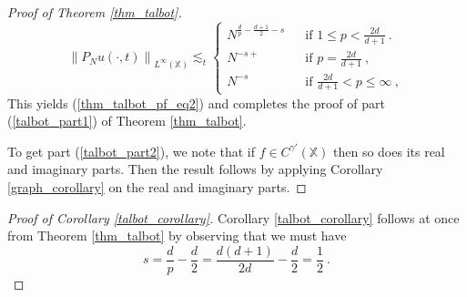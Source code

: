 \documentclass[12pt]{amsart}
\theoremstyle{definition}
\newcommand{\X}{\mathbb X}%
\numberwithin{equation}{section}
\begin{document}
\begin{proof}[Proof of Theorem \ref{thm_talbot}]
\begin{equation*}
\left\|P_Nu(\cdot,t)\right\|_{L^\infty(\X)} \lesssim_t \begin{cases}
	 N^{\frac{d}{p}-\frac{d+1}{2}-s}\:\:&\text{ if } 1\le p < \frac{2d}{d+1}\:.\\
	 	 N^{-s+}\:\:&\text{ if } p=\frac{2d}{d+1}\:,\\
	 	 N^{-s}\:\:&\text{ if } \frac{2d}{d+1} < p \le \infty\:,
	\end{cases}
\end{equation*}
This yields (\ref{thm_talbot_pf_eq2}) and completes the proof of part (\ref{talbot_part1}) of Theorem \ref{thm_talbot}.

\medskip

To get part (\ref{talbot_part2}), we note that if $f \in C^{\gamma'}(\X)$ then so does its real and imaginary parts. Then the result follows by applying Corollary \ref{graph_corollary} on the real and imaginary parts.
\end{proof}

\begin{proof}[Proof of Corollary \ref{talbot_corollary}]
Corollary \ref{talbot_corollary} follows at once from Theorem \ref{thm_talbot} by observing that we must have $$s=\frac{d}{p}-\frac{d}{2}=\frac{d(d+1)}{2d}-\frac{d}{2}=\frac{1}{2}\:.$$
\end{proof}
\end{document}
